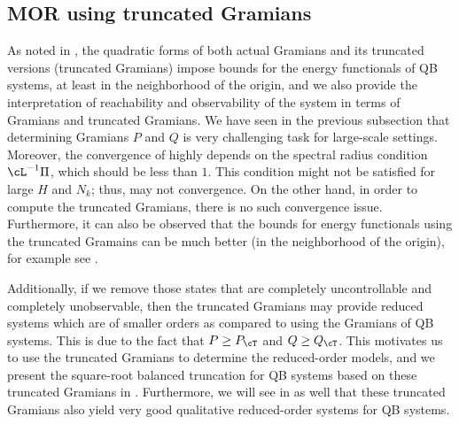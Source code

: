 \subsection{MOR using truncated Gramians}
As noted in , the quadratic forms of both actual Gramians and its truncated versions (truncated Gramians) impose  bounds for the energy functionals of QB systems, at least in the neighborhood of the origin, and we also provide the interpretation of reachability and observability of the system in terms of Gramians and truncated Gramians.  We have seen in the previous subsection that determining Gramians $P$ and $Q$ is very challenging task for large-scale settings.  Moreover, the convergence of   highly depends on the spectral radius condition $\cL^{-1}\Pi$, which should be less than $1$. This condition might not be satisfied  for large $H$ and $N_k$; thus,   may not convergence.  On the other hand, in order to compute the truncated Gramians, there is no such convergence issue. Furthermore, it can also be  observed that the bounds for energy functionals using the truncated Gramains can be much better (in the neighborhood of the origin), for example see . 

Additionally, if we remove those states that are completely uncontrollable and completely unobservable, then the truncated Gramians may provide reduced systems which are of smaller orders as compared to using the Gramians of QB systems. This is due to the fact that $P \geq P_\cT$ and $Q \geq Q_\cT$. This motivates us to use the truncated Gramians to determine the reduced-order models, and we present the square-root balanced truncation for QB systems based on these truncated Gramians in .  Furthermore, we will see in  as well that these truncated Gramians also yield very good qualitative reduced-order systems for QB systems.


